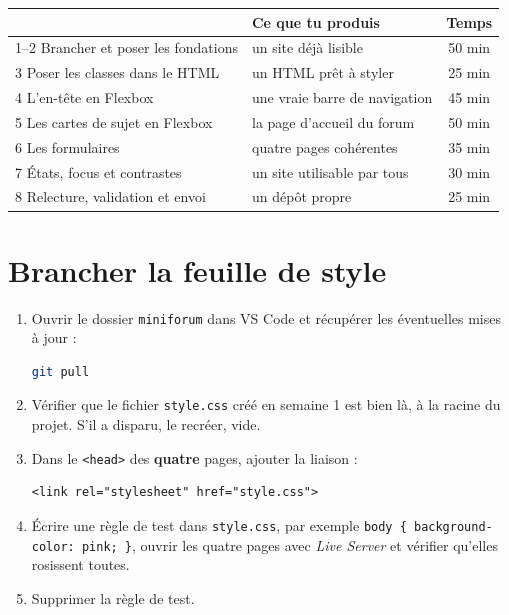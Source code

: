 \documentclass[a4paper,11pt]{article}
\newcommand{\hdr}[1]{\multicolumn{1}{l}{\color{white}\bfseries #1}}
\newcommand{\hdrc}[1]{\multicolumn{1}{c}{\color{white}\bfseries #1}}
\renewcommand{\arraystretch}{1.3}
\begin{document}
\vspace{4pt}
\begin{center}
\renewcommand{\arraystretch}{1.0}
\begin{tabularx}{\linewidth}{p{6.6cm}Xc}
  \toprule
  \rowcolor{uniNavy}
  \hdr{Étape} & \hdr{Ce que tu produis} & \hdrc{Temps} \\
  \midrule
  \rowcolor{uniPaper}
  1--2 \quad Brancher et poser les fondations & un site déjà lisible & 50 min \\
  3 \quad\; Poser les classes dans le HTML & un HTML prêt à styler & 25 min \\
  \rowcolor{uniPaper}
  4 \quad\; L'en-tête en Flexbox & une vraie barre de navigation & 45 min \\
  5 \quad\; Les cartes de sujet en Flexbox & la page d'accueil du forum & 50 min \\
  \rowcolor{uniPaper}
  6 \quad\; Les formulaires & quatre pages cohérentes & 35 min \\
  7 \quad\; États, focus et contrastes & un site utilisable par tous & 30 min \\
  \rowcolor{uniPaper}
  8 \quad\; Relecture, validation et envoi & un dépôt propre & 25 min \\
  \bottomrule
\end{tabularx}
\end{center}

\section{Brancher la feuille de style}

\begin{enumerate}
  \item Ouvrir le dossier \texttt{miniforum} dans VS Code et récupérer les éventuelles mises à jour :
\begin{lstlisting}[language=bash, numbers=none]
git pull
\end{lstlisting}
  \item Vérifier que le fichier \texttt{style.css} créé en semaine 1 est bien là, à la racine du projet. S'il a disparu, le recréer, vide.
  \item Dans le \texttt{<head>} des \textbf{quatre} pages, ajouter la liaison :
\begin{lstlisting}[language=HTML5, numbers=none]
<link rel="stylesheet" href="style.css">
\end{lstlisting}
  \item Écrire une règle de test dans \texttt{style.css}, par exemple \texttt{body \{ background-color: pink; \}}, ouvrir les quatre pages avec \textit{Live Server} et vérifier qu'elles rosissent toutes.
  \item Supprimer la règle de test.
\end{enumerate}
\end{document}

